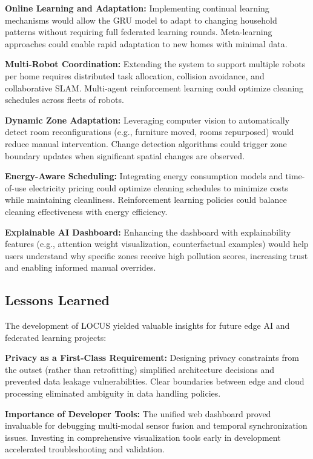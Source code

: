 \documentclass[conference]{IEEEtran}
\begin{document}
\textbf{Online Learning and Adaptation:} Implementing continual learning mechanisms would allow the GRU model to adapt to changing household patterns without requiring full federated learning rounds. Meta-learning approaches could enable rapid adaptation to new homes with minimal data.

\textbf{Multi-Robot Coordination:} Extending the system to support multiple robots per home requires distributed task allocation, collision avoidance, and collaborative SLAM. Multi-agent reinforcement learning could optimize cleaning schedules across fleets of robots.

\textbf{Dynamic Zone Adaptation:} Leveraging computer vision to automatically detect room reconfigurations (e.g., furniture moved, rooms repurposed) would reduce manual intervention. Change detection algorithms could trigger zone boundary updates when significant spatial changes are observed.

\textbf{Energy-Aware Scheduling:} Integrating energy consumption models and time-of-use electricity pricing could optimize cleaning schedules to minimize costs while maintaining cleanliness. Reinforcement learning policies could balance cleaning effectiveness with energy efficiency.

\textbf{Explainable AI Dashboard:} Enhancing the dashboard with explainability features (e.g., attention weight visualization, counterfactual examples) would help users understand why specific zones receive high pollution scores, increasing trust and enabling informed manual overrides.

\subsection{Lessons Learned}

The development of LOCUS yielded valuable insights for future edge AI and federated learning projects:

\textbf{Privacy as a First-Class Requirement:} Designing privacy constraints from the outset (rather than retrofitting) simplified architecture decisions and prevented data leakage vulnerabilities. Clear boundaries between edge and cloud processing eliminated ambiguity in data handling policies.

\textbf{Importance of Developer Tools:} The unified web dashboard proved invaluable for debugging multi-modal sensor fusion and temporal synchronization issues. Investing in comprehensive visualization tools early in development accelerated troubleshooting and validation.
\end{document}
